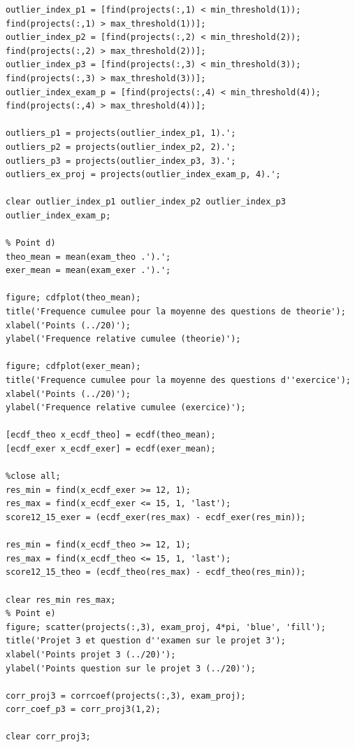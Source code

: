 \documentclass[a4paper,11pt]{article}
\begin{document}
\begin{lstlisting}[caption={\texttt{Question1.m}}]
% Finding outliers indexes
outlier_index_p1 = [find(projects(:,1) < min_threshold(1)); find(projects(:,1) > max_threshold(1))];
outlier_index_p2 = [find(projects(:,2) < min_threshold(2)); find(projects(:,2) > max_threshold(2))];
outlier_index_p3 = [find(projects(:,3) < min_threshold(3)); find(projects(:,3) > max_threshold(3))];
outlier_index_exam_p = [find(projects(:,4) < min_threshold(4)); find(projects(:,4) > max_threshold(4))];

outliers_p1 = projects(outlier_index_p1, 1).';
outliers_p2 = projects(outlier_index_p2, 2).';
outliers_p3 = projects(outlier_index_p3, 3).';
outliers_ex_proj = projects(outlier_index_exam_p, 4).'; 

clear outlier_index_p1 outlier_index_p2 outlier_index_p3 outlier_index_exam_p;

% Point d)
theo_mean = mean(exam_theo .').';
exer_mean = mean(exam_exer .').';

figure; cdfplot(theo_mean);
title('Frequence cumulee pour la moyenne des questions de theorie');
xlabel('Points (../20)');
ylabel('Frequence relative cumulee (theorie)');

figure; cdfplot(exer_mean);
title('Frequence cumulee pour la moyenne des questions d''exercice');
xlabel('Points (../20)');
ylabel('Frequence relative cumulee (exercice)');

[ecdf_theo x_ecdf_theo] = ecdf(theo_mean);
[ecdf_exer x_ecdf_exer] = ecdf(exer_mean);

%close all;
res_min = find(x_ecdf_exer >= 12, 1);
res_max = find(x_ecdf_exer <= 15, 1, 'last');
score12_15_exer = (ecdf_exer(res_max) - ecdf_exer(res_min));

res_min = find(x_ecdf_theo >= 12, 1);
res_max = find(x_ecdf_theo <= 15, 1, 'last');
score12_15_theo = (ecdf_theo(res_max) - ecdf_theo(res_min));

clear res_min res_max;
% Point e)
figure; scatter(projects(:,3), exam_proj, 4*pi, 'blue', 'fill');
title('Projet 3 et question d''examen sur le projet 3');
xlabel('Points projet 3 (../20)');
ylabel('Points question sur le projet 3 (../20)');

corr_proj3 = corrcoef(projects(:,3), exam_proj);
corr_coef_p3 = corr_proj3(1,2);

clear corr_proj3;
\end{lstlisting}
\end{document}
